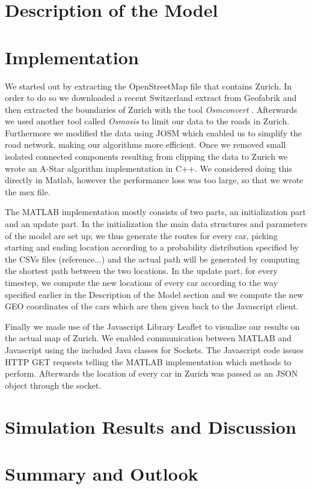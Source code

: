 \documentclass[11pt]{article}
\begin{document}
\section{Description of the Model}

\section{Implementation}
We started out by extracting the OpenStreetMap file that contains Zurich.
In order to do so we downloaded a recent Switzerland extract from Geofabrik \cite{geofab} and then extracted the boundaries of Zurich with the tool \emph{Osmconvert} \cite{osmconv}.
Afterwards we used another tool called \emph{Osmosis} to limit our data to the roads in Zurich.
Furthermore we modified the data using JOSM which enabled us to simplify the road network, making our algorithms more efficient.
Once we removed small isolated connected components resulting from clipping the data to Zurich we wrote an A-Star algorithm implementation in C++.
We considered doing this directly in Matlab, however the performance loss was too large, so that we wrote the mex file.

The MATLAB implementation mostly consists of two parts, an initialization part and an update part. In the initialization the main data structures and parameters of the model are set up; we thus generate the routes for every car, picking starting and ending location according to a probability distribution specified by the CSVs files (reference...) and the actual path will be generated by computing the shortest path between the two locations. In the update part, for every timestep, we compute the new locations of every car according to the way specified earlier in the Description of the Model section and we compute the new GEO coordinates of the cars which are then given back to the Javascript client.


Finally we made use of the Javascript Library Leaflet to visualize our results on the actual map of Zurich.
We enabled communication between MATLAB and Javascript using the included Java classes for Sockets.
The Javascript code issues HTTP GET requests telling the MATLAB implementation which methods to perform.
Afterwards the location of every car in Zurich was passed as an JSON object through the socket.


\section{Simulation Results and Discussion}

\section{Summary and Outlook}


\newpage
\printbibliography
\end{document}
